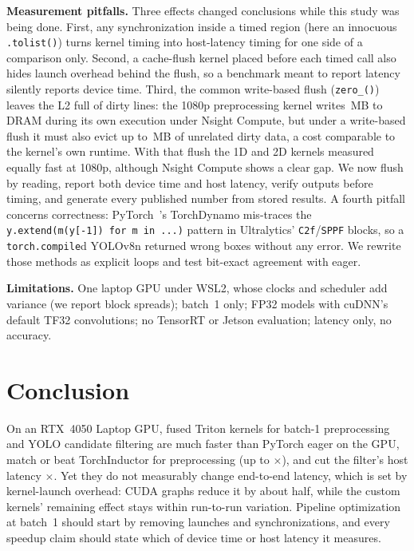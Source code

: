 \documentclass[10pt,twocolumn,letterpaper]{article}
\begin{document}
\noindent\textbf{Measurement pitfalls.} Three effects changed conclusions while this study was
being done. First, any synchronization inside a timed region (here an innocuous \texttt{.tolist()})
turns kernel timing into host-latency timing for one side of a comparison only. Second, a cache-flush
kernel placed before each timed call also hides launch overhead behind the flush, so a benchmark
meant to report latency silently reports device time. Third, the common write-based flush (\texttt{zero\_()}) leaves
the L2 full of dirty lines: the 1080p preprocessing kernel writes \,MB
to DRAM during its own execution under Nsight Compute, but under a write-based flush it must also
evict up to \,MB of unrelated dirty data, a cost comparable to the kernel's own
runtime. With that flush the 1D and 2D kernels measured equally fast at 1080p, although Nsight Compute
shows a clear gap. We now flush by reading, report both device time and host latency, verify outputs before timing,
and generate every published number from stored results. A fourth pitfall concerns correctness: PyTorch~'s TorchDynamo mis-traces the
\texttt{y.extend(m(y[-1]) for m in ...)} pattern in Ultralytics' \texttt{C2f}/\texttt{SPPF} blocks, so a
\texttt{torch.compile}d YOLOv8n returned wrong boxes without any error. We rewrite those methods
as explicit loops and test bit-exact agreement with eager.

\noindent\textbf{Limitations.} One laptop GPU under WSL2, whose clocks and scheduler add variance
(we report block spreads); batch~1 only; FP32 models with cuDNN's default TF32 convolutions; no
TensorRT or Jetson evaluation; latency only, no accuracy.

\section{Conclusion}
On an RTX~4050 Laptop GPU, fused Triton kernels for batch-1 preprocessing and YOLO candidate
filtering are much faster than PyTorch eager on the GPU, match or beat TorchInductor for
preprocessing (up to $\times$), and cut the filter's host latency
$\times$. Yet they do not measurably change end-to-end
latency, which is set by kernel-launch overhead: CUDA graphs reduce it by about half, while the
custom kernels' remaining effect stays within run-to-run variation. Pipeline
optimization at batch~1 should start by removing launches and synchronizations, and every speedup
claim should state which of device time or host latency it measures.

\footnotesize


\end{document}
